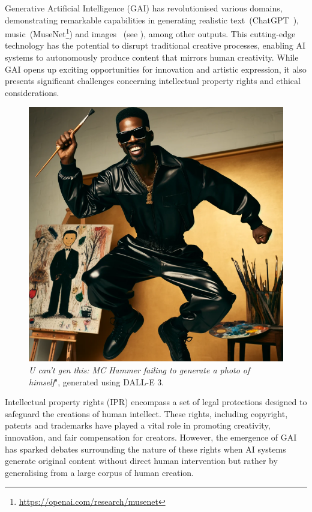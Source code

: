 \documentclass[conference,table]{IEEEtran}
\begin{document}
Generative Artificial Intelligence (GAI) has revolutionised various domains, demonstrating remarkable capabilities in generating realistic text~(ChatGPT~\cite{openai_gpt-4_2023}), music~(MuseNet\footnote{\url{https://openai.com/research/musenet}}) and images~\cite{rombach_high-resolution_2022,ramesh_hierarchical_2022} (see ), among other outputs.
This cutting-edge technology has the potential to disrupt traditional creative processes, enabling AI systems to autonomously produce content that mirrors human creativity. 
While GAI opens up exciting opportunities for innovation and artistic expression, it also presents significant challenges concerning intellectual property rights and ethical considerations.
\begin{figure}[ht]
    \centering
    \includegraphics[width=\linewidth]{figures/mchammer.png}
    \caption[]{\textit{U can't gen this: MC Hammer failing to generate a photo of himself}", generated using DALL-E 3\footnotemark.
    } 
    \label{fig:introduction}
\end{figure}
Intellectual property rights (IPR) encompass a set of legal protections designed to safeguard the creations of human intellect. These rights, including copyright, patents and trademarks have played a vital role in promoting creativity, innovation, and fair compensation for creators. However, the emergence of GAI has sparked debates surrounding the nature of these rights when AI systems generate original content without direct human intervention but rather by generalising from a large corpus of human creation.
\end{document}
